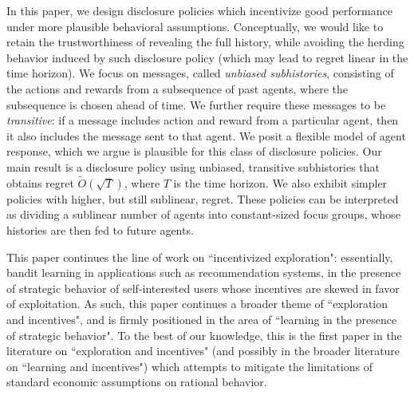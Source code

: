 \documentclass[11pt,letterpaper]{article}
\begin{document}
In this paper, we design disclosure policies which incentivize good performance under more plausible behavioral assumptions. Conceptually, we would like to retain the trustworthiness of revealing the full history, while avoiding the herding behavior induced by such disclosure policy (which may lead to regret linear in the time horizon). We focus on messages, called {\em unbiased subhistories}, consisting of the actions and rewards from a subsequence of past agents, where the subsequence is chosen ahead of time. We further require these messages to be \emph{transitive}: if a message includes action and reward from a particular agent, then it also includes the message sent to that agent. We posit a flexible model of agent response, which we argue is plausible for this class of disclosure policies. Our main result is a disclosure policy using unbiased, transitive subhistories that obtains regret $\tilde{O}(\sqrt{T})$, where $T$ is the time horizon.  We also exhibit simpler policies with higher, but still sublinear, regret.  These policies can be interpreted as dividing a sublinear number of agents into constant-sized focus groups, whose histories are then fed to future agents.

\vspace{2mm}

This paper continues the line of work on ``incentivized exploration": essentially, bandit learning in applications such as recommendation systems, in the presence of strategic behavior of self-interested users whose incentives are skewed in favor of exploitation. As such, this paper continues a broader theme of ``exploration and incentives", and is firmly positioned in the area of ``learning in the presence of strategic behavior". To the best of our knowledge, this is the first paper in the literature on ``exploration and incentives" (and possibly in the broader literature on ``learning and incentives") which attempts to mitigate the limitations of standard economic assumptions on rational behavior.
\end{document}
